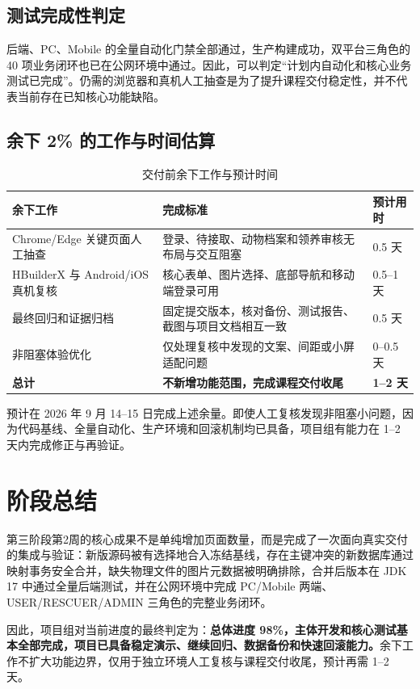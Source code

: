 \documentclass[UTF8,a4paper,zihao=-4,fontset=mac]{ctexart}
\begin{document}
\subsection{测试完成性判定}

后端、PC、Mobile 的全量自动化门禁全部通过，生产构建成功，双平台三角色的 40 项业务闭环也已在公网环境中通过。因此，可以判定“计划内自动化和核心业务测试已完成”。仍需的浏览器和真机人工抽查是为了提升课程交付稳定性，并不代表当前存在已知核心功能缺陷。

\subsection{余下 2\% 的工作与时间估算}

\begin{table}[H]
\centering
\caption{交付前余下工作与预计时间}
\label{tab:remaining}
\begin{tabularx}{\textwidth}{L{4.2cm}Y C{2.2cm}}
\toprule
{}\color{white}\bfseries 余下工作 & \color{white}\bfseries 完成标准 & \color{white}\bfseries 预计用时 \\
\midrule
Chrome/Edge 关键页面人工抽查 & 登录、待接取、动物档案和领养审核无布局与交互阻塞 & 0.5 天 \\
HBuilderX 与 Android/iOS 真机复核 & 核心表单、图片选择、底部导航和移动端登录可用 & 0.5--1 天 \\
最终回归和证据归档 & 固定提交版本，核对备份、测试报告、截图与项目文档相互一致 & 0.5 天 \\
非阻塞体验优化 & 仅处理复核中发现的文案、间距或小屏适配问题 & 0--0.5 天 \\
\midrule
\textbf{总计} & \textbf{不新增功能范围，完成课程交付收尾} & \textbf{1--2 天} \\
\bottomrule
\end{tabularx}
\end{table}

预计在 2026 年 9 月 14--15 日完成上述余量。即使人工复核发现非阻塞小问题，因为代码基线、全量自动化、生产环境和回滚机制均已具备，项目组有能力在 1--2 天内完成修正与再验证。

\section{阶段总结}

第三阶段第2周的核心成果不是单纯增加页面数量，而是完成了一次面向真实交付的集成与验证：新版源码被有选择地合入冻结基线，存在主键冲突的新数据库通过映射事务安全合并，缺失物理文件的图片元数据被明确排除，合并后版本在 JDK 17 中通过全量后端测试，并在公网环境中完成 PC/Mobile 两端、USER/RESCUER/ADMIN 三角色的完整业务闭环。

因此，项目组对当前进度的最终判定为：\textbf{总体进度 98\%，主体开发和核心测试基本全部完成，项目已具备稳定演示、继续回归、数据备份和快速回滚能力。}余下工作不扩大功能边界，仅用于独立环境人工复核与课程交付收尾，预计再需 1--2 天。
\end{document}
